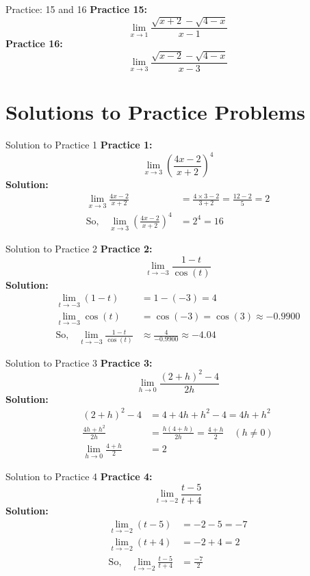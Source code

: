 \documentclass[aspectratio=169]{beamer}
\begin{document}
\begin{frame}{Practice: 15 and 16}
\textbf{Practice 15:}
\[
\lim_{x \to 1} \frac{\sqrt{x+2}-\sqrt{4-x}}{x-1}
\]
\vspace{1em}
\textbf{Practice 16:}
\[
\lim_{x \to 3} \frac{\sqrt{x-2}-\sqrt{4-x}}{x-3}
\]
\end{frame}


\section{Solutions to Practice Problems}

\begin{frame}{Solution to Practice 1}
\textbf{Practice 1:}
\[
\lim_{x \to 3} \left(\frac{4x-2}{x+2}\right)^4
\]
\textbf{Solution:}
\begin{align*}
\lim_{x \to 3} \frac{4x-2}{x+2} &= \frac{4\times 3-2}{3+2} = \frac{12-2}{5} = 2 \\
\text{So,}\quad \lim_{x \to 3} \left(\frac{4x-2}{x+2}\right)^4 &= 2^4 = 16
\end{align*}
\end{frame}

\begin{frame}{Solution to Practice 2}
\textbf{Practice 2:}
\[
\lim_{t \to -3} \frac{1-t}{\cos(t)}
\]
\textbf{Solution:}
\begin{align*}
\lim_{t \to -3} (1-t) &= 1-(-3) = 4 \\
\lim_{t \to -3} \cos(t) &= \cos(-3) = \cos(3) \approx -0.9900 \\
\text{So,}\quad \lim_{t \to -3} \frac{1-t}{\cos(t)} &\approx \frac{4}{-0.9900} \approx -4.04
\end{align*}
\end{frame}

\begin{frame}{Solution to Practice 3}
\textbf{Practice 3:}
\[
\lim_{h \to 0} \frac{(2+h)^2-4}{2h}
\]
\textbf{Solution:}
\begin{align*}
(2+h)^2-4 &= 4+4h+h^2-4 = 4h+h^2 \\
\frac{4h+h^2}{2h} &= \frac{h(4+h)}{2h} = \frac{4+h}{2} \quad (h \neq 0) \\
\lim_{h \to 0} \frac{4+h}{2} &= 2
\end{align*}
\end{frame}

\begin{frame}{Solution to Practice 4}
\textbf{Practice 4:}
\[
\lim_{t \to -2} \frac{t-5}{t+4}
\]
\textbf{Solution:}
\begin{align*}
\lim_{t \to -2} (t-5) &= -2-5 = -7 \\
\lim_{t \to -2} (t+4) &= -2+4 = 2 \\
\text{So,}\quad \lim_{t \to -2} \frac{t-5}{t+4} &= \frac{-7}{2}
\end{align*}
\end{frame}
\end{document}
